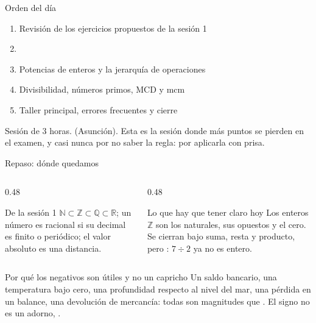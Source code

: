 \documentclass[aspectratio=169,10pt]{beamer}
\begin{document}
	
	\portada
	
	\begin{frame}{Orden del día}
		\begin{enumerate}
			\item Revisión de los ejercicios propuestos de la sesión 1
			\item {}
			\item Potencias de enteros y la jerarquía de operaciones
			\item Divisibilidad, números primos, MCD y mcm
			\item Taller principal, errores frecuentes y cierre
		\end{enumerate}
		
		\vspace{0.25cm}
		{\footnotesize\color{uniGris} Sesión de 3 horas.
			 (Asunción). Esta es la sesión donde más
			puntos se pierden en el examen, y casi nunca por no saber la regla: por
			aplicarla con prisa.}
	\end{frame}
	
	\begin{frame}{Repaso: dónde quedamos}
		\scriptsize
		\begin{columns}[T,onlytextwidth]
			\begin{column}{0.48\textwidth}
				\begin{block}{De la sesión 1}
					\tiny
					$\mathbb{N}\subset\mathbb{Z}\subset\mathbb{Q}\subset\mathbb{R}$; un
					número es racional si su decimal es finito o periódico; el valor
					absoluto es una distancia.
				\end{block}
			\end{column}
			\begin{column}{0.48\textwidth}
				\begin{alertblock}{Lo que hay que tener claro hoy}
					\tiny
					Los enteros $\mathbb{Z}$ son los naturales, sus opuestos y el cero.
					Se cierran bajo suma, resta y producto, pero : $7\div 2$ ya no es entero.
				\end{alertblock}
			\end{column}
		\end{columns}
		
		\vspace{0.12cm}
		\begin{exampleblock}{Por qué los negativos son útiles y no un capricho}
			\tiny
			Un saldo bancario, una temperatura bajo cero, una profundidad respecto al
			nivel del mar, una pérdida en un balance, una devolución de mercancía:
			todas son magnitudes que . El signo no es un
			adorno, .
		\end{exampleblock}
	\end{frame}
	
\end{document}

